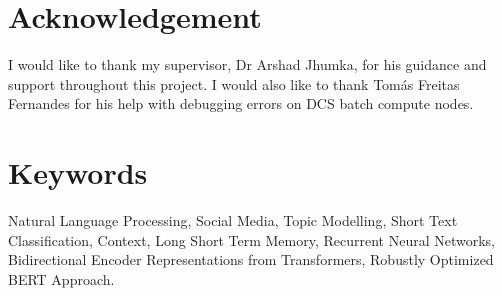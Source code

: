 \section*{Acknowledgement}
I would like to thank my supervisor, Dr Arshad Jhumka, for his guidance and support throughout this project. I would also like to thank
Tom\'as Freitas Fernandes for his help with debugging errors on DCS batch compute nodes.

\section*{Keywords}
Natural Language Processing, Social Media, Topic Modelling, Short Text Classification, Context,
Long Short Term Memory, Recurrent Neural Networks, Bidirectional Encoder Representations from Transformers,
Robustly Optimized BERT Approach.